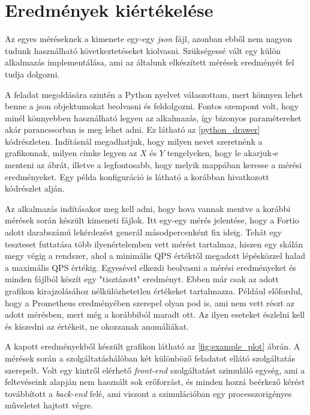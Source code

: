 \section{Eredmények kiértékelése}
Az egyes méréseknek a kimenete egy-egy \textit{json} fájl, azonban ebből nem nagyon tudunk használható következtetéseket kiolvasni. Szükségessé vált egy külön alkalmazás implementálása, ami az általunk elkészített mérések eredményét fel tudja dolgozni. 

A feladat megoldására szintén a Python nyelvet válaszottam, mert könnyen lehet benne a json objektumokat beolvasni és feldolgozni.
Fontos szempont volt, hogy minél könnyebben használható legyen az alkalmazás, így bizonyos paramétereket akár parancssorban is meg lehet adni. Ez látható az \ref{python_drawer} kódrészleten. Indításnál megadhatjuk, hogy milyen nevet szeretnénk a grafikonnak, milyen címke legyen az $X$ és $Y$ tengelyeken, hogy le akarjuk-e menteni az ábrát, illetve a legfontosabb, hogy melyik mappában keresse a mérési eredményeket. Egy példa konfiguráció is látható a korábban hivatkozott kódrészlet alján. \\

\lstset{caption=Eredményeket feldolgozó alkalmazás használata, label=python_drawer}


Az alkalmazás indításakor meg kell adni, hogy hova vannak mentve a korábbi mérések során készült kimeneti fájlok. Itt egy-egy mérés jelentése, hogy a Fortio adott darabszámú lekérdezést generál másodpercenként fix ideig. Tehát egy teszteset futtatása több ilyenértelemben vett mérést tartalmaz, hiszen egy skálán megy végig a rendszer, ahol a minimális QPS értéktől megadott lépésközzel halad a maximális QPS értékig. 
Egyesével elkezdi beolvasni a mérési eredményeket és minden fájlból készít egy "tisztázott" eredményt. Ebben már csak az adott grafikon kirajzolásához nélkülözhetetlen értékeket tartalmazza. Például előfordul, hogy a Prometheus eredményében szerepel olyan pod is, ami nem vett részt az adott mérésben, mert még a korábbiból maradt ott. Az ilyen eseteket észlelni kell és kiszedni az értékeit, ne okozzanak anomáliákat. 

A kapott eredményekből készült grafikon látható az \ref{fig:example_plot} ábrán. A mérések során a szolgáltatáshálóban két különböző feladatot ellátó szolgáltatás szerepelt. Volt egy kintről elérhető \textit{front-end} szolgáltatást szimuláló egység, ami a feltevéseink alapján nem használt sok erőforrást, és minden hozzá beérkező kérést továbbított a \textit{back-end} felé, ami viszont a szimulációban egy processzorigényes műveletet hajtott végre. 

